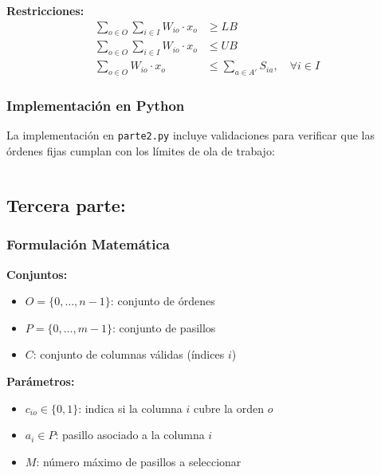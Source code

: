 \documentclass[a4paper,12pt]{article}
\begin{document}
\textbf{Restricciones:}
\begin{align}
\sum_{o \in O} \sum_{i \in I} W_{io} \cdot x_o &\geq LB \\
\sum_{o \in O} \sum_{i \in I} W_{io} \cdot x_o &\leq UB \\
\sum_{o \in O} W_{io} \cdot x_o &\leq \sum_{a \in A'} S_{ia}, \quad \forall i \in I
\end{align}

\subsubsection{Implementación en Python}

La implementación en \texttt{parte2.py} incluye validaciones para verificar que las órdenes fijas cumplan con los límites de ola de trabajo:

\begin{lstlisting}[language=Python, caption=Implementación clave de la segunda parte]

\end{lstlisting}

\clearpage

\subsection{Tercera parte:}
\label{sec:variante3}

\subsubsection{Formulación Matemática}

\textbf{Conjuntos:}
\begin{itemize}
    \item $O = \{0, \ldots, n-1\}$: conjunto de órdenes
    \item $P = \{0, \ldots, m-1\}$: conjunto de pasillos
    \item $C$: conjunto de columnas válidas (índices $i$)
\end{itemize}

\textbf{Parámetros:}
\begin{itemize}
    \item $c_{io} \in \{0,1\}$: indica si la columna $i$ cubre la orden $o$
    \item $a_i \in P$: pasillo asociado a la columna $i$
    \item $M$: número máximo de pasillos a seleccionar
\end{itemize}
\end{document}
